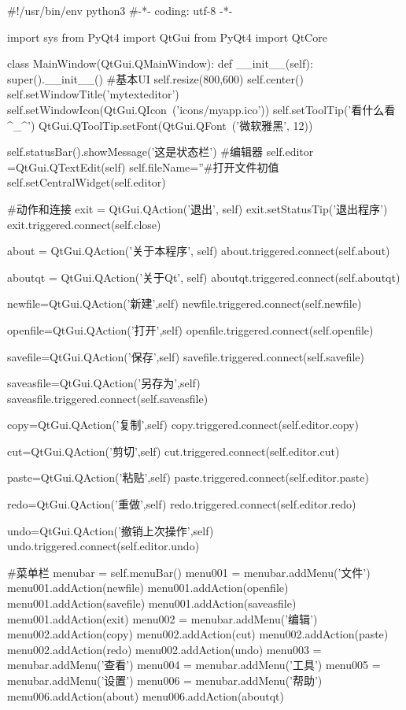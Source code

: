 \documentclass[12pt,oneside]{book}
\begin{document}
\begin{common-format}
\begin{tcbpython}[]
#!/usr/bin/env python3
#-*- coding: utf-8 -*-

import sys
from PyQt4  import QtGui
from PyQt4  import QtCore

class MainWindow(QtGui.QMainWindow):
    def __init__(self):
        super().__init__()
#基本UI
        self.resize(800,600)
        self.center()
        self.setWindowTitle('mytexteditor')
        self.setWindowIcon(QtGui.QIcon\
        ('icons/myapp.ico'))
        self.setToolTip('看什么看^_^')
        QtGui.QToolTip.setFont(QtGui.QFont\
        ('微软雅黑', 12))

        self.statusBar().showMessage('这是状态栏')
#编辑器
        self.editor =QtGui.QTextEdit(self)
        self.fileName=''#打开文件初值
        self.setCentralWidget(self.editor)

#动作和连接
        exit = QtGui.QAction('退出', self)
        exit.setStatusTip('退出程序')
        exit.triggered.connect(self.close)

        about = QtGui.QAction('关于本程序', self)
        about.triggered.connect(self.about)

        aboutqt = QtGui.QAction('关于Qt', self)
        aboutqt.triggered.connect(self.aboutqt)

        newfile=QtGui.QAction('新建',self)
        newfile.triggered.connect(self.newfile)

        openfile=QtGui.QAction('打开',self)
        openfile.triggered.connect(self.openfile)

        savefile=QtGui.QAction('保存',self)
        savefile.triggered.connect(self.savefile)

        saveasfile=QtGui.QAction('另存为',self)
        saveasfile.triggered.connect(self.saveasfile)

        copy=QtGui.QAction('复制',self)
        copy.triggered.connect(self.editor.copy)

        cut=QtGui.QAction('剪切',self)
        cut.triggered.connect(self.editor.cut)

        paste=QtGui.QAction('粘贴',self)
        paste.triggered.connect(self.editor.paste)

        redo=QtGui.QAction('重做',self)
        redo.triggered.connect(self.editor.redo)

        undo=QtGui.QAction('撤销上次操作',self)
        undo.triggered.connect(self.editor.undo)

#菜单栏
        menubar = self.menuBar()
        menu001 = menubar.addMenu('文件')
        menu001.addAction(newfile)
        menu001.addAction(openfile)
        menu001.addAction(savefile)
        menu001.addAction(saveasfile)
        menu001.addAction(exit)
        menu002 = menubar.addMenu('编辑')
        menu002.addAction(copy)
        menu002.addAction(cut)
        menu002.addAction(paste)
        menu002.addAction(redo)
        menu002.addAction(undo)
        menu003 = menubar.addMenu('查看')
        menu004 = menubar.addMenu('工具')
        menu005 = menubar.addMenu('设置')
        menu006 = menubar.addMenu('帮助')
        menu006.addAction(about)
        menu006.addAction(aboutqt)


\end{tcbpython}
\end{common-format}
\end{document}
